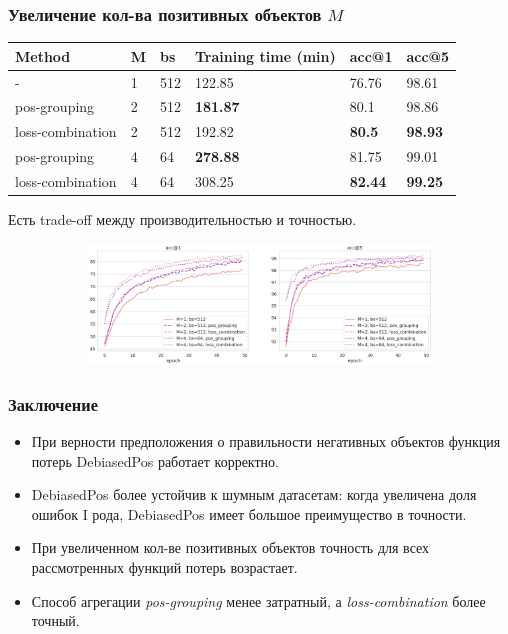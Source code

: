 \documentclass[
	11pt, %
	t, %
        russian
]{beamer}
\begin{document}
\begin{frame}
	\frametitle{Увеличение кол-ва позитивных объектов $M$}
\scriptsize
\begin{table}
    \tiny
    \centering
    \begin{tabular}{llllll}
        \toprule
        Method  & M & bs    & Training time (min)   & acc@1 & acc@5\\
        \midrule
        -   & 1 & 512   & 122.85    & 76.76 & 98.61\\
        \midrule
        pos-grouping    & 2 & 512   & \textbf{181.87}   & 80.1  & 98.86\\
        loss-combination    & 2 & 512   & 192.82    & \textbf{80.5} & \textbf{98.93}\\
        \midrule
        pos-grouping    & 4 & 64    & \textbf{278.88}   & 81.75 & 99.01\\
        loss-combination    & 4 & 64    & 308.25    & \textbf{82.44} & \textbf{99.25}\\
        \bottomrule
    \end{tabular}
    \label{tab:table}
\end{table}

\scriptsize Есть trade-off между производительностью и точностью.

\begin{figure}
\centering
\begin{subfigure}
  \centering
  \includegraphics[width=1\linewidth]{Images/pg_vs_lc.png}
  \label{fig:sub1}
\end{subfigure}
\label{fig:test}
\end{figure}

\end{frame}


\begin{frame}
    \frametitle{Заключение}

\begin{itemize}
\small
    \item При верности предположения о правильности негативных объектов функция потерь DebiasedPos работает корректно.
    \vfill
    \item DebiasedPos более устойчив к шумным датасетам: когда увеличена доля ошибок I рода, DebiasedPos имеет большое преимущество в точности.
    \vfill
    \item При увеличенном кол-ве позитивных объектов точность для всех рассмотренных функций потерь возрастает.
    \vfill
    \item Способ агрегации \textit{pos-grouping} менее затратный, а \textit{loss-combination} более точный.
\end{itemize}

\end{frame}
\end{document}
